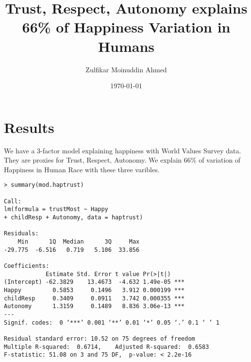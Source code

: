 \documentclass{amsart}
\title{Trust, Respect, Autonomy explains 66\% of Happiness Variation in Humans}
\author{Zulfikar Moinuddin Ahmed}
\date{\today}
\begin{document}
\maketitle
\section{Results}
We have a 3-factor model explaining happiness with World Values Survey data.  They are proxies for Trust, Respect, Autonomy. We explain 66\% of variation of Happiness in Human Race with these three varibles.

\begin{verbatim}
> summary(mod.haptrust)

Call:
lm(formula = trustMost ~ Happy 
+ childResp + Autonomy, data = haptrust)

Residuals:
    Min      1Q  Median      3Q     Max 
-29.775  -6.516   0.719   5.106  33.856 

Coefficients:
            Estimate Std. Error t value Pr(>|t|)    
(Intercept) -62.3829    13.4673  -4.632 1.49e-05 ***
Happy         0.5853     0.1496   3.912 0.000199 ***
childResp     0.3409     0.0911   3.742 0.000355 ***
Autonomy      1.3159     0.1489   8.836 3.06e-13 ***
---
Signif. codes:  0 ‘***’ 0.001 ‘**’ 0.01 ‘*’ 0.05 ‘.’ 0.1 ‘ ’ 1

Residual standard error: 10.52 on 75 degrees of freedom
Multiple R-squared:  0.6714,	Adjusted R-squared:  0.6583 
F-statistic: 51.08 on 3 and 75 DF,  p-value: < 2.2e-16
\end{verbatim}
\end{document}

